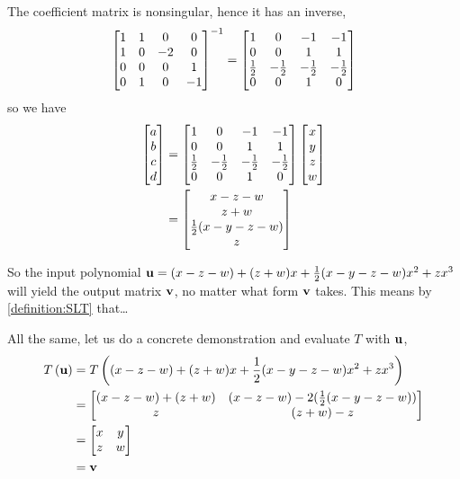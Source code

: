 \documentclass{ximera}
\begin{document}
\begin{example}
The coefficient matrix is nonsingular, hence it has an inverse,
\[
\inverse{
\begin{bmatrix}
1 & 1 & 0 & 0\\
1 & 0 & -2 & 0 \\
0 & 0 & 0 & 1\\
0 & 1 & 0 & -1
\end{bmatrix}
}
=
\begin{bmatrix}
1 & 0 & -1 & -1\\
0 & 0 & 1 & 1\\
\frac{1}{2} & -\frac{1}{2} & -\frac{1}{2} & -\frac{1}{2}\\
0 & 0 & 1 & 0
\end{bmatrix}
\]
so we have
\begin{align*}
\colvector{a\\b\\c\\d}&=
\begin{bmatrix}
1 & 0 & -1 & -1\\
0 & 0 & 1 & 1\\
\frac{1}{2} & -\frac{1}{2} & -\frac{1}{2} & -\frac{1}{2}\\
0 & 0 & 1 & 0
\end{bmatrix}
\colvector{x\\y\\z\\w}\\%
&=
\colvector{
x-z-w\\
z+w\\
\frac{1}{2}(x-y-z-w)\\
z
}
\end{align*}




So the input polynomial $\mathbf{u}=(x-z-w)+(z+w)x+\frac{1}{2}(x-y-z-w)x^2+zx^3$ will yield the output matrix $\mathbf{v}$, no matter what form $\mathbf{v}$ takes.  This means by \ref{definition:SLT} that\ldots
\begin{multipleChoice}
\end{multipleChoice}

  All the same, let us do a concrete demonstration and evaluate $T$ with $\mathbf{u}$,
\begin{align*}
T\left(\mathbf{u}\right)&=T\left((x-z-w)+(z+w)x+\frac{1}{2}(x-y-z-w)x^2+zx^3\right)\\
&=
\begin{bmatrix}
(x-z-w)+(z+w) & (x-z-w) - 2(\frac{1}{2}(x-y-z-w))\\
z & (z+w)-z
\end{bmatrix}\\
&=
\begin{bmatrix}
x & y\\
z & w
\end{bmatrix}\\
&=\mathbf{v}
\end{align*}




\end{example}
\end{document}
